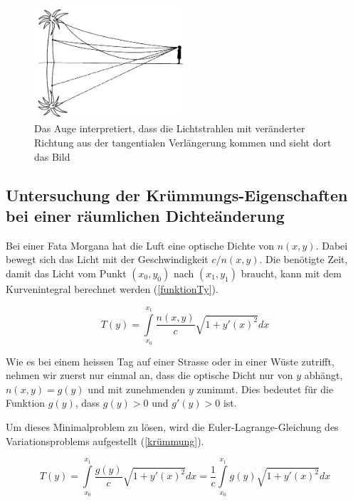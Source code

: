 \begin{figure}[H]
\begin{center}
\includegraphics[width=0.5\textwidth]{./picture/FataEinleitung.png}
	\caption{Das Auge interpretiert, dass die Lichtstrahlen mit veränderter Richtung aus der tangentialen Verlängerung kommen und sieht dort das Bild}
	\label{Ab:fataEinleitung}
\end{center}	
\end{figure}


\subsection{Untersuchung der Krümmungs-Eigenschaften bei einer räumlichen Dichteänderung \label{sec:Krümmung}}

Bei einer Fata Morgana hat die Luft eine optische Dichte von $n(x,y)$. 
Dabei bewegt sich das Licht mit der Geschwindigkeit $c/n(x,y)$. 
Die benötigte Zeit, damit das Licht vom Punkt $(x_0, y_0)$ nach $(x_1, y_1)$ braucht,
kann mit dem Kurvenintegral berechnet werden (\eqref{funktionTy}).

\begin{equation}
	T(y) = \int \limits_{x_0}^{x_1} \frac{n(x,y)}{c} \sqrt{1 + y'(x)^2} dx
	\label{funktionTy}
\end{equation}

Wie es bei einem heissen Tag auf einer Strasse oder in einer Wüste zutrifft,
nehmen wir zuerst nur einmal an, dass die optische Dicht nur von $y$ abhängt,
$n(x,y) = g(y)$ und mit zunehmenden $y$ zunimmt.
Dies bedeutet für die Funktion $g(y)$, dass $g(y) > 0$ und $g'(y) > 0 $ ist.

Um dieses Minimalproblem zu lösen, wird die Euler-Lagrange-Gleichung des Variationsproblems aufgestellt (\eqref{krümmung}).

\begin{equation}
	T(y) = \int \limits_{x_0}^{x_1} \frac{g(y)}{c} \sqrt{1 + y'(x)^2} dx = \frac{1}{c} \int \limits_{x_0}^{x_1} g(y) \sqrt{1 + y'(x)^2} dx
	\label{krümmung}
\end{equation}

